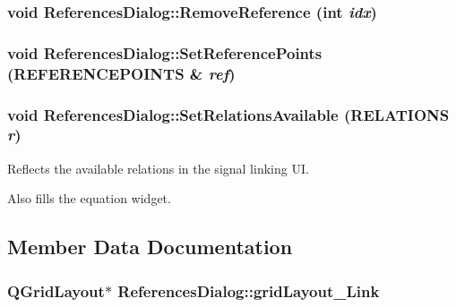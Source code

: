 \hypertarget{class_references_dialog_a3d2a1436ffccecfb90117d0ddd3803d}{
\subsubsection[{RemoveReference}]{\setlength{\rightskip}{0pt plus 5cm}void ReferencesDialog::RemoveReference (int {\em idx})}}
\label{class_references_dialog_a3d2a1436ffccecfb90117d0ddd3803d}


\hypertarget{class_references_dialog_d085c5bc795c22f77d91646b83d80980}{
\subsubsection[{SetReferencePoints}]{\setlength{\rightskip}{0pt plus 5cm}void ReferencesDialog::SetReferencePoints ({\bf REFERENCEPOINTS} \& {\em ref})}}
\label{class_references_dialog_d085c5bc795c22f77d91646b83d80980}


\hypertarget{class_references_dialog_07d39aeb362342ef4be3cc1f364a5e5d}{
\subsubsection[{SetRelationsAvailable}]{\setlength{\rightskip}{0pt plus 5cm}void ReferencesDialog::SetRelationsAvailable ({\bf RELATIONS} {\em r})}}
\label{class_references_dialog_07d39aeb362342ef4be3cc1f364a5e5d}


Reflects the available relations in the signal linking UI. 

Also fills the equation widget. 

\subsection{Member Data Documentation}
\hypertarget{class_references_dialog_8bbbdea6e4f6324c6ebc244a7388d5b4}{
\subsubsection[{gridLayout\_\-Link}]{\setlength{\rightskip}{0pt plus 5cm}QGridLayout$\ast$ {\bf ReferencesDialog::gridLayout\_\-Link}}}
\label{class_references_dialog_8bbbdea6e4f6324c6ebc244a7388d5b4}


